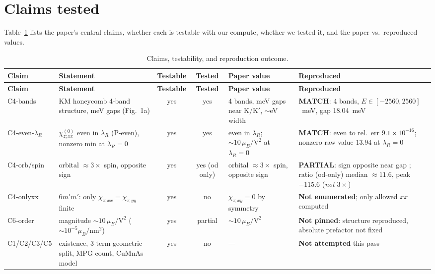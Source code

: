 \documentclass[11pt]{article}
\newcommand{\chizxx}{\chi^{(0)}_{z;xx}}
\newcommand{\lamR}{\lambda_{R}}
\newcommand{\muB}{\mu_{B}}
\begin{document}
\section{Claims tested}
Table~\ref{tab:claims} lists the paper's central claims, whether each is
testable with our compute, whether we tested it, and the paper vs.\
reproduced values.

\begin{longtable}{@{}p{1.6cm} p{4.3cm} c c p{2.6cm} p{2.9cm}@{}}
\caption{Claims, testability, and reproduction outcome.}
\label{tab:claims}\\
\toprule
\textbf{Claim} & \textbf{Statement} & \textbf{Testable} & \textbf{Tested}
& \textbf{Paper value} & \textbf{Reproduced} \\
\midrule
\endfirsthead
\toprule
\textbf{Claim} & \textbf{Statement} & \textbf{Testable} & \textbf{Tested}
& \textbf{Paper value} & \textbf{Reproduced} \\
\midrule
\endhead
C4-bands & KM honeycomb 4-band structure, meV gaps (Fig.~1a) & yes & yes
& 4 bands, meV gaps near K/K$'$, $\sim$eV width
& \textbf{MATCH}: 4 bands, $E\in[-2560,2560]$~meV, gap 18.04~meV \\
\addlinespace
C4-even-$\lamR$ & $\chizxx$ even in $\lamR$ (P-even), nonzero min at
$\lamR{=}0$ & yes & yes & even in $\lamR$; $\sim\!10\,\muB/\mathrm{V}^2$
at $\lamR{=}0$ & \textbf{MATCH}: even to rel.\ err $9.1\times10^{-16}$;
nonzero raw value $13.94$ at $\lamR{=}0$ \\
\addlinespace
C4-orb/spin & orbital $\approx 3\times$ spin, opposite sign & yes & yes
(od only) & orbital $\approx 3\times$ spin, opposite sign
& \textbf{PARTIAL}: sign opposite near gap \checkmark; ratio (od-only)
median $\approx 11.6$, peak $-115.6$ (\emph{not} $3\times$) \\
\addlinespace
C4-onlyxx & $6m'm'$: only $\chi_{z;xx}{=}\chi_{z;yy}$ finite & yes & no
& $\chi_{z;xy}{=}0$ by symmetry
& \textbf{Not enumerated}; only allowed $xx$ computed \\
\addlinespace
C6-order & magnitude $\sim\!10\,\muB/\mathrm{V}^2$
($\sim\!10^{-5}\muB/\mathrm{nm}^2$) & yes & partial & $\sim\!10\,\muB/\mathrm{V}^2$
& \textbf{Not pinned}: structure reproduced, absolute prefactor not fixed \\
\addlinespace
C1/C2/C3/C5 & existence, 3-term geometric split, MPG count, CuMnAs model
& yes & no & --- & \textbf{Not attempted} this pass \\
\bottomrule
\end{longtable}
\end{document}
